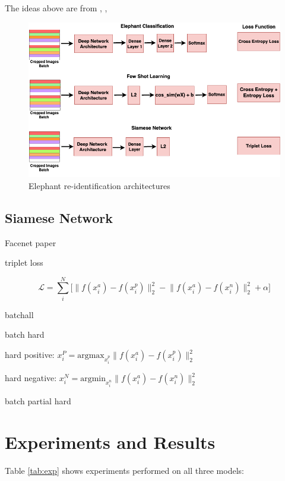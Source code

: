 \documentclass[10pt,twocolumn,letterpaper]{article}
\begin{document}
The ideas above are from \cite{fewshotlectures}, \cite{fewshotbaseline}, \cite{fewshotmetabaseline}


\begin{figure}[t]
  \centering
  \includegraphics[scale=0.275]{reidentification_network}
   \caption{Elephant re-identification architectures}
   \label{fig:reidentification_network}
\end{figure}

\subsection{Siamese Network}

Facenet paper

triplet loss

$$
\mathcal{L} = \sum_{i}^N \Big[ \lVert f(x_i^a) - f(x_i^p)\rVert_2^2 - \lVert f(x_i^a) - f(x_i^n)\rVert_2^2  + \alpha \Big]
$$

batchall

batch hard

hard positive: $x_i^P = \text{argmax}_{x_i^p}  \lVert f(x_i^a) - f(x_i^p)\rVert_2^2$

hard negative: $x_i^N = \text{argmin}_{x_i^n}  \lVert f(x_i^a) - f(x_i^n)\rVert_2^2$

batch partial hard




\section{Experiments and Results}
\label{sec:expresults}

Table \ref{tab:exp} shows experiments performed on all three models:
\end{document}
